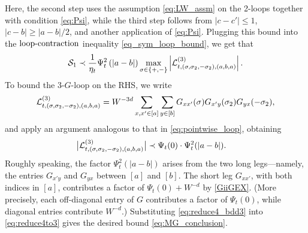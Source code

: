 Here, the second step uses the assumption \eqref{eq:LW_assm} on the 2-loops together with condition \eqref{eq:Psi}, while the third step follows from $|c-c'|\le 1$, $|c-b|\ge |a-b|/2$, and another application of \eqref{eq:Psi}. Plugging this bound into the $\text{loop-contraction}$ inequality \eqref{eq_sym_loop_bound}, we get that
\begin{equation}\label{eq:reduce4to3}
    \mathcal{S}_1 \prec \frac{1}{\eta_t} \Psi_t^2\left(|a-b|\right) \max_{\sigma\in\{+,-\}}\left|\mathcal{L}^{(3)}_{t, (\sigma,\sigma_2,-\sigma_2), (a,b,a)}\right|.
\end{equation}
To bound the 3-$G$-loop on the RHS, we write
\[\mathcal{L}^{(3)}_{t, (\sigma,\sigma_2,-\sigma_2), (a,b,a)}=W^{-3d}\sum_{x,x'\in [a]}\sum_{y\in[b]}G_{xx'}(\sigma)G_{x'y}(\sigma_2)G_{yx}(-\sigma_2), \]
and apply an argument analogous to that in \eqref{eq:pointwise_loop}, obtaining 
\begin{align}
\big| \mathcal{L}^{(3)}_{t, (\sigma,\sigma_2,-\sigma_2), (a,b,a)}\big|& \prec \Psi_t(0) \cdot \Psi_t^2(|a-b|).\label{eq:reduce4_bdd3}
\end{align} 
Roughly speaking, the factor $ \Psi_t^2(|a-b|)$ arises from the two long legs---namely, the entries $G_{x'y}$ and $G_{yx}$ between $[a]$ and $[b]$. The short leg $G_{xx'}$, with both indices in $[a]$, contributes a factor of $\Psi_t(0)+W^{-d}$ by \eqref{GiiGEX}. (More precisely, each off-diagonal entry of $G$ contributes a factor of $\Psi_t(0)$, while diagonal entries contribute $W^{-d}$.) Substituting \eqref{eq:reduce4_bdd3} into \eqref{eq:reduce4to3} gives the desired bound \eqref{eq:MG_conclusion}.



